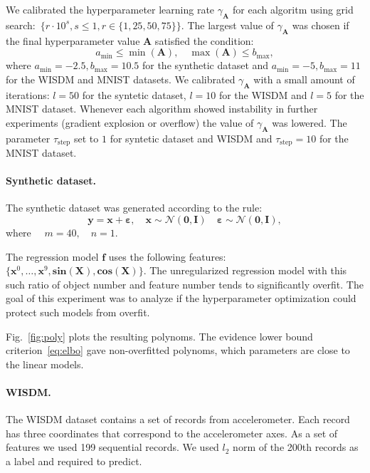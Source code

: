 \documentclass[12pt]{article}
\begin{document}
We calibrated the hyperparameter learning rate $\gamma_{\mathbf{A}}$  for each algoritm using grid search:~$\{r \cdot 10^{s}, s \leq 1, r \in \{1,25,50,75\}\}$. The largest value of $\gamma_{\mathbf{A}}$ was chosen if the final hyperparameter value $\mathbf{A}$ satisfied the condition:
\[
    a_\text{min} \leq  \min(\mathbf{A}), \quad \max(\mathbf{A}) \leq b_\text{max},
\] 
where $a_\text{min} = -2.5, b_\text{max}=10.5$ for the synthetic dataset and $a_\text{min} = -5, b_\text{max}=11$ for the WISDM and MNIST datasets. We calibrated $\gamma_\mathbf{A}$ with a small amount of iterations: $l=50$ for the syntetic dataset, $l=10$ for the WISDM and $l=5$ for the MNIST dataset. Whenever each algorithm showed instability in further experiments (gradient explosion or overflow) the value of $\gamma_{\mathbf{A}}$ was lowered. The parameter $\tau_\text{step}$ set to $1$ for syntetic dataset and WISDM and  $\tau_\text{step}=10$ for the MNIST dataset.



\paragraph{Synthetic dataset.}
The synthetic dataset was generated according to the rule:
\[
	\mathbf{y} = \mathbf{x} + \boldsymbol{\varepsilon},\quad \mathbf{x}  \sim \mathcal{N}(\mathbf{0}, \mathbf{I}) \quad \boldsymbol{\varepsilon} \sim \mathcal{N}(\mathbf{0}, \mathbf{I}),
\]
where $\quad m = 40, \quad n = 1.$

The regression model $\mathbf{f}$ uses the following features: $\{\mathbf{x}^0, \dots, \mathbf{x}^9, \textbf{sin}(\mathbf{X}), \textbf{cos}(\mathbf{X})\}$. The unregularized regression model with this such ratio of  object number and feature number tends to significantly overfit. The goal of this experiment was to analyze if the hyperparameter optimization could protect such models from overfit.

Fig.~\ref{fig:poly} plots the resulting polynoms. 
The evidence lower bound criterion~\eqref{eq:elbo} gave non-overfitted polynoms, which parameters are close to the linear models.

\paragraph{WISDM.}
The WISDM dataset contains a set of records from accelerometer. Each record has three coordinates that correspond to the accelerometer axes. As a set of features we used 199 sequential records. We used $l_2$ norm of the 200th records as a label and required to predict. 
\end{document}
